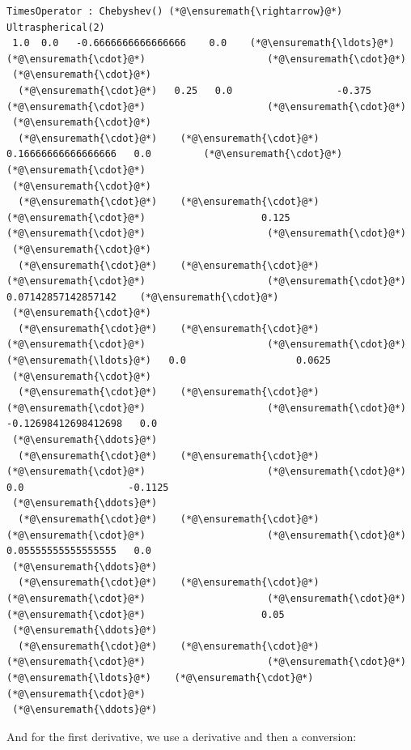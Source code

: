\documentclass[12pt,a4paper]{article}
\begin{document}
\begin{lstlisting}
TimesOperator : Chebyshev() (*@\ensuremath{\rightarrow}@*) Ultraspherical(2)
 1.0  0.0   -0.6666666666666666    0.0    (*@\ensuremath{\ldots}@*)    (*@\ensuremath{\cdot}@*)                     (*@\ensuremath{\cdot}@*)     
 (*@\ensuremath{\cdot}@*)
  (*@\ensuremath{\cdot}@*)   0.25   0.0                  -0.375       (*@\ensuremath{\cdot}@*)                     (*@\ensuremath{\cdot}@*)     
 (*@\ensuremath{\cdot}@*)
  (*@\ensuremath{\cdot}@*)    (*@\ensuremath{\cdot}@*)     0.16666666666666666   0.0         (*@\ensuremath{\cdot}@*)                     (*@\ensuremath{\cdot}@*)     
 (*@\ensuremath{\cdot}@*)
  (*@\ensuremath{\cdot}@*)    (*@\ensuremath{\cdot}@*)      (*@\ensuremath{\cdot}@*)                    0.125       (*@\ensuremath{\cdot}@*)                     (*@\ensuremath{\cdot}@*)     
 (*@\ensuremath{\cdot}@*)
  (*@\ensuremath{\cdot}@*)    (*@\ensuremath{\cdot}@*)      (*@\ensuremath{\cdot}@*)                     (*@\ensuremath{\cdot}@*)         0.07142857142857142    (*@\ensuremath{\cdot}@*)     
 (*@\ensuremath{\cdot}@*)
  (*@\ensuremath{\cdot}@*)    (*@\ensuremath{\cdot}@*)      (*@\ensuremath{\cdot}@*)                     (*@\ensuremath{\cdot}@*)     (*@\ensuremath{\ldots}@*)   0.0                   0.0625 
 (*@\ensuremath{\cdot}@*)
  (*@\ensuremath{\cdot}@*)    (*@\ensuremath{\cdot}@*)      (*@\ensuremath{\cdot}@*)                     (*@\ensuremath{\cdot}@*)        -0.12698412698412698   0.0    
 (*@\ensuremath{\ddots}@*)
  (*@\ensuremath{\cdot}@*)    (*@\ensuremath{\cdot}@*)      (*@\ensuremath{\cdot}@*)                     (*@\ensuremath{\cdot}@*)         0.0                  -0.1125 
 (*@\ensuremath{\ddots}@*)
  (*@\ensuremath{\cdot}@*)    (*@\ensuremath{\cdot}@*)      (*@\ensuremath{\cdot}@*)                     (*@\ensuremath{\cdot}@*)         0.05555555555555555   0.0    
 (*@\ensuremath{\ddots}@*)
  (*@\ensuremath{\cdot}@*)    (*@\ensuremath{\cdot}@*)      (*@\ensuremath{\cdot}@*)                     (*@\ensuremath{\cdot}@*)          (*@\ensuremath{\cdot}@*)                    0.05   
 (*@\ensuremath{\ddots}@*)
  (*@\ensuremath{\cdot}@*)    (*@\ensuremath{\cdot}@*)      (*@\ensuremath{\cdot}@*)                     (*@\ensuremath{\cdot}@*)     (*@\ensuremath{\ldots}@*)    (*@\ensuremath{\cdot}@*)                     (*@\ensuremath{\cdot}@*)     
 (*@\ensuremath{\ddots}@*)
\end{lstlisting}


And for the first derivative, we use a derivative and then a conversion:
\end{document}
